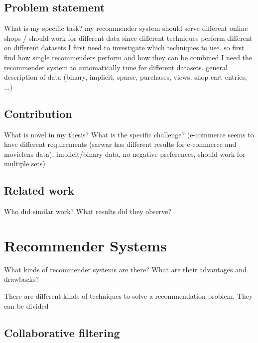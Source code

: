 \documentclass[10pt]{reportMaster}
\begin{document}


\section{Problem statement}
What is my specific task?
my recommender system should serve different online shops / should work for different data
since different techniques perform different on different datasets I first need to investigate which techniques to use.
so first find how single recommenders perform and how they can be combined
I need the recommender system to automatically tune for different datasets.
general description of data (binary, implicit, sparse, purchases, views, shop cart entries, ...)

\section{Contribution}
What is novel in my thesis?
What is the specific challenge? (e-commerce seems to have different requirements (sarwar has different results for e-commerce and movielens data), implicit/binary data, no negative preferences, should work for multiple sets)

\section{Related work}
Who did similar work?
What results did they observe?










\chapter{Recommender Systems}
What kinds of recommender systems are there?
What are their advantages and drawbacks?

There are different kinds of techniques to solve a recommendation problem.
They can be divided 

\section{Collaborative filtering}
\end{document}
